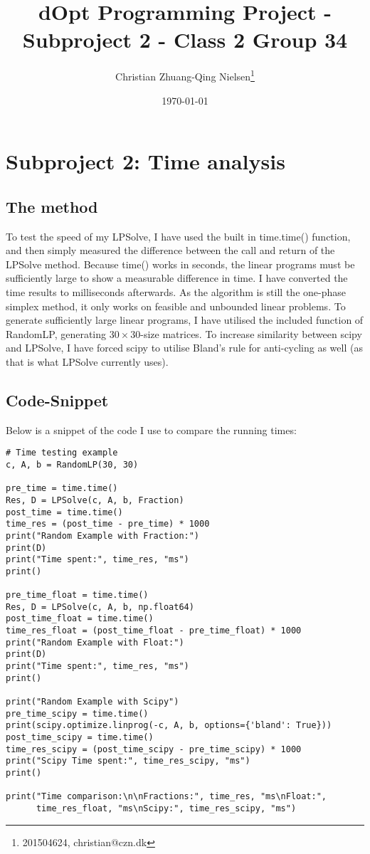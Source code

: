 \documentclass{article}
\author{Christian Zhuang-Qing Nielsen\thanks{201504624, christian@czn.dk}}
\date{\today}
\title{dOpt Programming Project - Subproject 2 - Class 2 Group 34}
\begin{document}
\maketitle
\tableofcontents


\section{Subproject 2: Time analysis}
\label{sec-1}
\subsection{The method}
\label{sec-1-1}
To test the speed of my LPSolve, I have used the built in time.time() function, and then simply measured the difference between the call and return of the LPSolve method. Because time() works in seconds, the linear programs must be sufficiently large to show a measurable difference in time. I have converted the time results to milliseconds afterwards. As the algorithm is still the one-phase simplex method, it only works on feasible and unbounded linear problems. To generate sufficiently large linear programs, I have utilised the included function of RandomLP, generating $30 \times 30$-size matrices. To increase similarity between scipy and LPSolve, I have forced scipy to utilise Bland's rule for anti-cycling as well (as that is what LPSolve currently uses).
\subsection{Code-Snippet}
\label{sec-1-2}
Below is a snippet of the code I use to compare the running times:
\lstset{language=Python,label=Testing-code,caption= ,numbers=none}
\begin{lstlisting}
# Time testing example
c, A, b = RandomLP(30, 30)

pre_time = time.time()
Res, D = LPSolve(c, A, b, Fraction)
post_time = time.time()
time_res = (post_time - pre_time) * 1000
print("Random Example with Fraction:")
print(D)
print("Time spent:", time_res, "ms")
print()

pre_time_float = time.time()
Res, D = LPSolve(c, A, b, np.float64)
post_time_float = time.time()
time_res_float = (post_time_float - pre_time_float) * 1000
print("Random Example with Float:")
print(D)
print("Time spent:", time_res, "ms")
print()

print("Random Example with Scipy")
pre_time_scipy = time.time()
print(scipy.optimize.linprog(-c, A, b, options={'bland': True}))
post_time_scipy = time.time()
time_res_scipy = (post_time_scipy - pre_time_scipy) * 1000
print("Scipy Time spent:", time_res_scipy, "ms")
print()

print("Time comparison:\n\nFractions:", time_res, "ms\nFloat:", 
      time_res_float, "ms\nScipy:", time_res_scipy, "ms")
\end{lstlisting}
\end{document}
